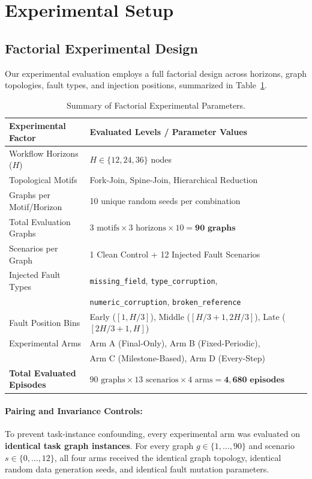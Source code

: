 \section{Experimental Setup}
\label{sec:experimental_setup}

\subsection{Factorial Experimental Design}
Our experimental evaluation employs a full factorial design across horizons, graph topologies, fault types, and injection positions, summarized in Table~\ref{tab:experimental_design}.

\begin{table}[t]
\centering
\small
\caption{Summary of Factorial Experimental Parameters.}
\label{tab:experimental_design}
\begin{tabular}{ll}
\toprule
\textbf{Experimental Factor} & \textbf{Evaluated Levels / Parameter Values} \\
\midrule
Workflow Horizons ($H$) & $H \in \{12, 24, 36\}$ nodes \\
Topological Motifs & Fork-Join, Spine-Join, Hierarchical Reduction \\
Graphs per Motif/Horizon & 10 unique random seeds per combination \\
Total Evaluation Graphs & $3 \text{ motifs} \times 3 \text{ horizons} \times 10 = \mathbf{90 \text{ graphs}}$ \\
Scenarios per Graph & 1 Clean Control + 12 Injected Fault Scenarios \\
Injected Fault Types & \texttt{missing\_field}, \texttt{type\_corruption}, \\
                     & \texttt{numeric\_corruption}, \texttt{broken\_reference} \\
Fault Position Bins & Early ($[1, H/3]$), Middle ($[H/3+1, 2H/3]$), Late ($[2H/3+1, H]$) \\
Experimental Arms & Arm A (Final-Only), Arm B (Fixed-Periodic), \\
                  & Arm C (Milestone-Based), Arm D (Every-Step) \\
\midrule
\textbf{Total Evaluated Episodes} & $90 \text{ graphs} \times 13 \text{ scenarios} \times 4 \text{ arms} = \mathbf{4,680 \text{ episodes}}$ \\
\bottomrule
\end{tabular}
\end{table}

\paragraph{Pairing and Invariance Controls:}
To prevent task-instance confounding, every experimental arm was evaluated on \textbf{identical task graph instances}. For every graph $g \in \{1, \dots, 90\}$ and scenario $s \in \{0, \dots, 12\}$, all four arms received the identical graph topology, identical random data generation seeds, and identical fault mutation parameters.

